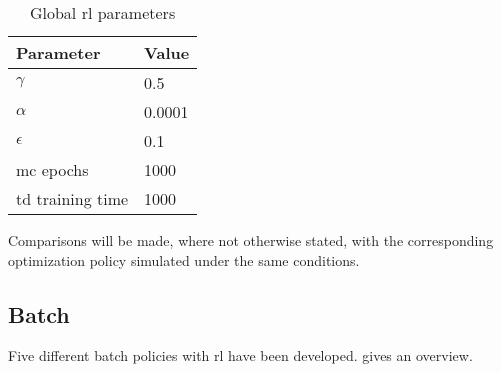\documentclass{seal_thesis}
\begin{document}
\begin{table}[!ht]
\centering
\begin{tabular}{@{}ll@{}}
\toprule
Parameter        & Value  \\ \midrule
$\gamma$            & 0.5    \\
$\alpha$            & 0.0001 \\
$\epsilon$          & 0.1    \\
\gls{mc} epochs        & 1000   \\
\gls{td} training time & 1000   \\ \bottomrule
\end{tabular}
\caption{Global \gls{rl} parameters}
\label{tab:global_rl_params}
\end{table}

Comparisons will be made, where not otherwise stated, with the corresponding optimization policy simulated under the same conditions.

\subsection{Batch}
\label{subsec:rl_batch}

Five different batch policies with \gls{rl} have been developed.  gives an overview.

\begin{table}[!ht]
\centering
{}
\caption{Overview of developed batch policies with \gls{rl}}
\label{tab:rl_batch_policies_overview}
\end{table}
\end{document}
